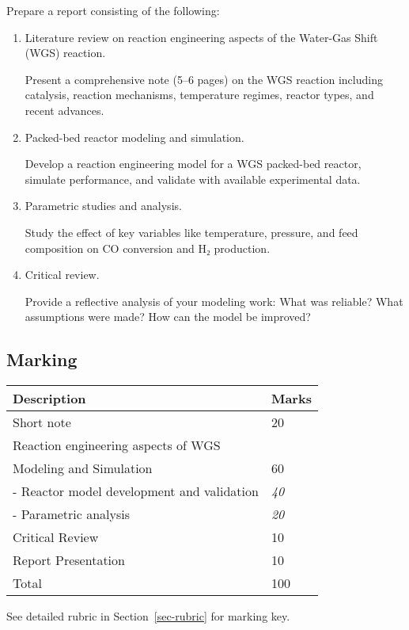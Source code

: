 \documentclass[
  12pt,
  a4paperpaper,
  DIV=11,
  numbers=noendperiod]{scrartcl}
\begin{document}
Prepare a report consisting of the following:

\begin{enumerate}
\def\labelenumi{\arabic{enumi}.}
\item
  Literature review on reaction engineering aspects of the Water-Gas
  Shift (WGS) reaction.

  Present a comprehensive note (5--6 pages) on the WGS reaction
  including catalysis, reaction mechanisms, temperature regimes, reactor
  types, and recent advances.
\item
  Packed-bed reactor modeling and simulation.

  Develop a reaction engineering model for a WGS packed-bed reactor,
  simulate performance, and validate with available experimental data.
\item
  Parametric studies and analysis.

  Study the effect of key variables like temperature, pressure, and feed
  composition on CO conversion and H₂ production.
\item
  Critical review.

  Provide a reflective analysis of your modeling work: What was
  reliable? What assumptions were made? How can the model be improved?
\end{enumerate}

\subsection{Marking}\label{marking}

\begin{longtable}[]{@{}ll@{}}
\toprule\noalign{}
Description & Marks \\
\midrule\noalign{}
\endhead
\bottomrule\noalign{}
\endlastfoot
Short note & 20 \\
Reaction engineering aspects of WGS & \\
Modeling and Simulation & 60 \\
- Reactor model development and validation & \emph{40} \\
- Parametric analysis & \emph{20} \\
Critical Review & 10 \\
Report Presentation & 10 \\
Total & 100 \\
\end{longtable}

See detailed rubric in Section~\ref{sec-rubric} for marking key.
\end{document}

